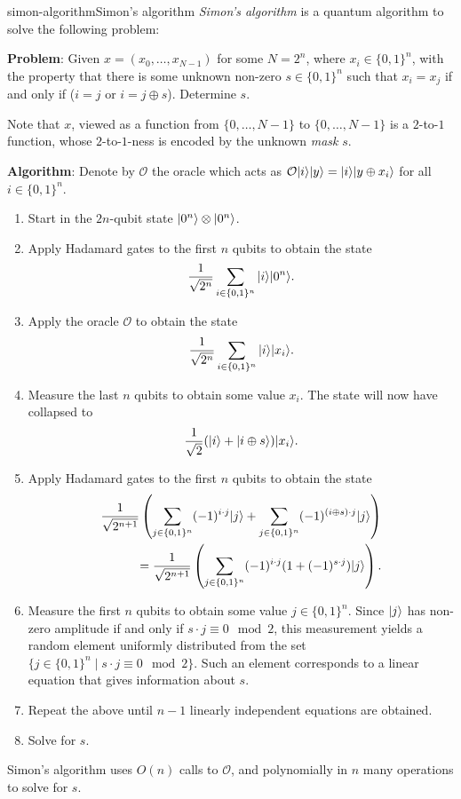 \begin{topic}{simon-algorithm}{Simon's algorithm}
    \emph{Simon's algorithm} is a quantum algorithm to solve the following problem:

    \textbf{Problem}: Given $x = (x_0, \ldots, x_{N - 1})$ for some $N = 2^n$, where $x_i \in \{ 0, 1 \}^n$, with the property that there is some unknown non-zero $s \in \{ 0, 1 \}^n$ such that $x_i = x_j$ if and only if ($i = j$ or $i = j \oplus s$). Determine $s$.

    Note that $x$, viewed as a function from $\{ 0, \ldots, N - 1 \}$ to $\{ 0, \ldots, N - 1 \}$ is a $2$-to-$1$ function, whose $2$-to-$1$-ness is encoded by the unknown \textit{mask} $s$.

    \textbf{Algorithm}: Denote by $\mathcal{O}$ the oracle which acts as $\mathcal{O} |i\rangle |y\rangle = |i\rangle |y \oplus x_i\rangle$ for all $i \in \{ 0, 1 \}^n$.
    \begin{enumerate}[label=(\arabic*)]
        \item Start in the $2n$-qubit state $|0^n\rangle \otimes |0^n\rangle$.
        \item Apply Hadamard gates to the first $n$ qubits to obtain the state
        \[ \frac{1}{\sqrt{2^n}} \sum_{i \in \{ 0, 1 \}^n} |i\rangle |0^n\rangle . \]
        \item Apply the oracle $\mathcal{O}$ to obtain the state
        \[ \frac{1}{\sqrt{2^n}} \sum_{i \in \{ 0, 1 \}^n} |i\rangle |x_i\rangle . \]
        \item Measure the last $n$ qubits to obtain some value $x_i$. The state will now have collapsed to
        \[ \frac{1}{\sqrt{2}} (|i\rangle + |i \oplus s\rangle) |x_i\rangle . \]
        \item Apply Hadamard gates to the first $n$ qubits to obtain the state
        \[ \begin{aligned}
            \frac{1}{\sqrt{2^{n + 1}}} \left( \sum_{j \in \{ 0, 1 \}^n} (-1)^{i \cdot j} |j\rangle + \sum_{j \in \{ 0, 1 \}^n} (-1)^{(i \oplus s) \cdot j} |j\rangle \right) \\
            = \frac{1}{\sqrt{2^{n + 1}}} \left( \sum_{j \in \{ 0, 1 \}^n} (-1)^{i \cdot j} (1 + (-1)^{s \cdot j}) |j\rangle \right) .
        \end{aligned} \]
        \item Measure the first $n$ qubits to obtain some value $j \in \{ 0, 1 \}^n$. Since $|j\rangle$ has non-zero amplitude if and only if $s \cdot j \equiv 0 \mod 2$, this measurement yields a random element uniformly distributed from the set $\{ j \in \{ 0, 1 \}^n \mid s \cdot j \equiv 0 \mod 2 \}$. Such an element corresponds to a linear equation that gives information about $s$.
        \item Repeat the above until $n - 1$ linearly independent equations are obtained.
        \item Solve for $s$.
    \end{enumerate}
    Simon's algorithm uses $O(n)$ calls to $\mathcal{O}$, and polynomially in $n$ many operations to solve for $s$.
\end{topic}

    
